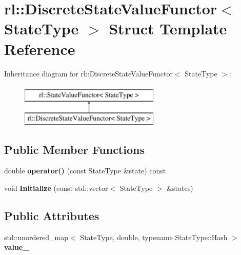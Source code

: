 \hypertarget{structrl_1_1_discrete_state_value_functor}{}\section{rl\+:\+:Discrete\+State\+Value\+Functor$<$ State\+Type $>$ Struct Template Reference}
\label{structrl_1_1_discrete_state_value_functor}
Inheritance diagram for rl\+:\+:Discrete\+State\+Value\+Functor$<$ State\+Type $>$\+:\begin{figure}[H]
\begin{center}
\leavevmode
\includegraphics[height=2.000000cm]{structrl_1_1_discrete_state_value_functor}
\end{center}
\end{figure}
\subsection*{Public Member Functions}
\begin{DoxyCompactItemize}
\item 
\hypertarget{structrl_1_1_discrete_state_value_functor_a63bf8449ed047b82326242424b8f1ef1}{}\label{structrl_1_1_discrete_state_value_functor_a63bf8449ed047b82326242424b8f1ef1} 
double {\bfseries operator()} (const State\+Type \&state) const
\item 
\hypertarget{structrl_1_1_discrete_state_value_functor_ac2c27101c79091445466bb4f3e5239c5}{}\label{structrl_1_1_discrete_state_value_functor_ac2c27101c79091445466bb4f3e5239c5} 
void {\bfseries Initialize} (const std\+::vector$<$ State\+Type $>$ \&states)
\end{DoxyCompactItemize}
\subsection*{Public Attributes}
\begin{DoxyCompactItemize}
\item 
\hypertarget{structrl_1_1_discrete_state_value_functor_a3467f778e304e14ddc44d271d41e0b6f}{}\label{structrl_1_1_discrete_state_value_functor_a3467f778e304e14ddc44d271d41e0b6f} 
std\+::unordered\+\_\+map$<$ State\+Type, double, typename State\+Type\+::\+Hash $>$ {\bfseries value\+\_\+}
\end{DoxyCompactItemize}


